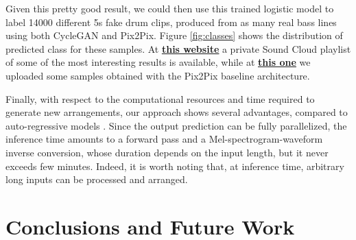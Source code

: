 \documentclass[journal]{IEEEtran}
\begin{document}
Given this pretty good result, we could then use this trained logistic model to label 14000 different 5s fake drum clips, produced from as many real bass lines using both CycleGAN and Pix2Pix. Figure \ref{fig:classes} shows the distribution of predicted class for these samples. At \underline{\textbf{\href{https://soundcloud.com/user-639025674/sets/bass2drums/s-jjccrgdXXOi}{this website}}} a private Sound Cloud playlist of some of the most interesting results is available, while at \underline{\textbf{\href{https://soundcloud.com/user-639025674/sets/bass2drums_baseline/s-rKqV2S2MFHw}{this one}}} we uploaded some samples obtained with the Pix2Pix baseline architecture. 

Finally, with respect to the computational resources and time required to generate new arrangements, our approach shows several advantages, compared to auto-regressive models \cite{dhariwal2020jukebox}. Since the output prediction can be fully parallelized, the inference time amounts to a forward pass and a Mel-spectrogram-waveform inverse conversion, whose duration depends on the input length, but it never exceeds few minutes. Indeed, it is worth noting that, at inference time, arbitrary long inputs can be processed and arranged.

\section{Conclusions and Future Work}
\end{document}
